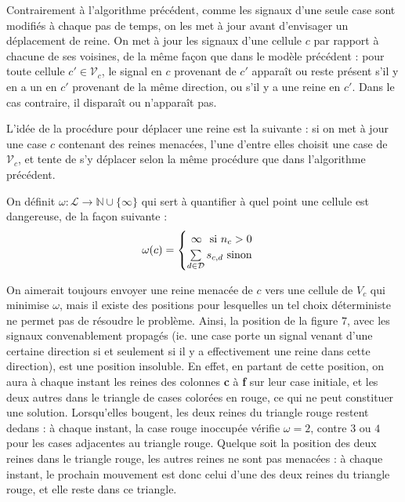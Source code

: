 \documentclass[11pt, openany]{article}
\newcommand{\N}{\mathbb{N}}
\newcommand{\La}{\mathcal{L}}
\newcommand{\D}{\mathcal{D}}
\newcommand{\E}{\mathcal{E}}
\newcommand{\V}{\mathcal V}
\begin{document}

\bigskip

Contrairement à l'algorithme précédent, comme les signaux d'une seule case sont modifiés à chaque pas de temps, on les met à jour avant d'envisager un déplacement de reine. On met à jour les signaux d'une cellule $c$ par rapport à chacune de ses voisines, de la même façon que dans le modèle précédent : pour toute cellule $c'\in\V_c$, le signal en $c$ provenant de $c'$ apparaît ou reste présent s'il y en a un en $c'$ provenant de la même direction, ou s'il y a une reine en $c'$. Dans le cas contraire, il disparaît ou n'apparaît pas.
\bigskip

L'idée de la procédure pour déplacer une reine est la suivante : si on met à jour une case $c$ contenant des reines menacées, l'une d'entre elles choisit une case de $\V_c$, et tente de s'y déplacer selon la même procédure que dans l'algorithme précédent. 

On définit $\omega : \La\to\N\cup\{\infty\}$ qui sert à quantifier à quel point une cellule est dangereuse, de la façon suivante : \[
\omega(c) = 
\begin{cases}
  \hfill \infty \hfill \text{ si $n_c > 0$}\\
  \hfill \sum\limits_{d\in\D}s_{c,d} \hfill \text{ sinon}
\end{cases}
\]

On aimerait toujours envoyer une reine menacée de $c$ vers une cellule de $V_c$ qui minimise $\omega$, mais il existe des positions pour lesquelles un tel choix déterministe ne permet pas de résoudre le problème. Ainsi, la position de la figure $7$, avec les signaux convenablement propagés (ie. une case porte un signal venant d'une certaine direction si et seulement si il y a effectivement une reine dans cette direction), est une position insoluble. En effet, en partant de cette position, on aura à chaque instant les reines des colonnes \textbf c à \textbf f sur leur case initiale, et les deux autres dans le triangle de cases colorées en rouge, ce qui ne peut constituer une solution. 
Lorsqu'elles bougent, les deux reines du triangle rouge restent dedans : à chaque instant, la case rouge inoccupée vérifie $\omega = 2$, contre $3$ ou $4$ pour les cases adjacentes au triangle rouge. Quelque soit la position des deux reines dans le triangle rouge, les autres reines ne sont pas menacées : à chaque instant, le prochain mouvement est donc celui d'une des deux reines du triangle rouge, et elle reste dans ce triangle.
\end{document}

